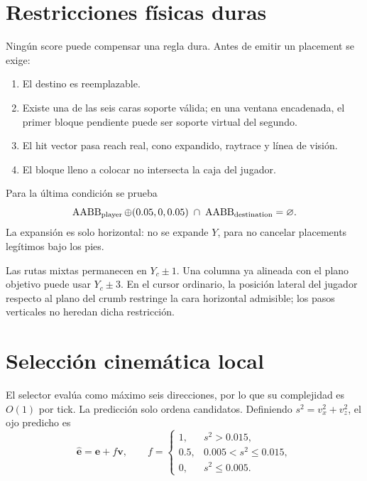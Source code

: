 \documentclass[11pt,a4paper]{article}
\begin{document}
\section{Restricciones físicas duras}

Ningún score puede compensar una regla dura. Antes de emitir un placement se exige:
\begin{enumerate}
 \item El destino es reemplazable.
 \item Existe una de las seis caras soporte válida; en una ventana encadenada, el
       primer bloque pendiente puede ser soporte virtual del segundo.
 \item El hit vector pasa reach real, cono expandido, raytrace y línea de visión.
 \item El bloque lleno a colocar no intersecta la caja del jugador.
\end{enumerate}

Para la última condición se prueba
\begin{equation}
 \operatorname{AABB}_{\rm player}\oplus(0.05,0,0.05)
 \;\cap\;\operatorname{AABB}_{\rm destination}=\varnothing.
\end{equation}
La expansión es solo horizontal: no se expande $Y$, para no cancelar placements
legítimos bajo los pies.

Las rutas mixtas permanecen en $Y_c\pm1$. Una columna ya alineada con el plano
objetivo puede usar $Y_c\pm3$. En el cursor ordinario, la posición lateral del
jugador respecto al plano del crumb restringe la cara horizontal admisible; los
pasos verticales no heredan dicha restricción.

\section{Selección cinemática local}

El selector evalúa como máximo seis direcciones, por lo que su complejidad es
$O(1)$ por tick. La predicción solo ordena candidatos. Definiendo
$s^2=v_x^2+v_z^2$, el ojo predicho es
\begin{equation}
 \widehat{\mathbf e}=\mathbf e+f\mathbf v,\qquad
 f=\begin{cases}
 1,&s^2>0.015,\\
 0.5,&0.005<s^2\leq0.015,\\
 0,&s^2\leq0.005.
 \end{cases}
\end{equation}
\end{document}
